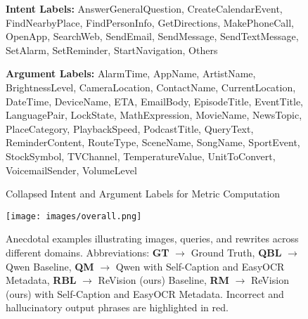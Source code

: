 \begin{figure*}[t]
    \centering
    \begin{tcolorbox}[colback=gray!10, colframe=gray!30, coltitle=black,
        fonttitle=\bfseries, 
        title=Intent and Argument Labels]
        
    \textbf{Intent Labels:}  
    AnswerGeneralQuestion, CreateCalendarEvent, FindNearbyPlace, FindPersonInfo, GetDirections, MakePhoneCall, OpenApp, SearchWeb, SendEmail, SendMessage, SendTextMessage, SetAlarm, SetReminder, StartNavigation, Others
    
    \vspace{5pt}
    
    \textbf{Argument Labels:}  %
    AlarmTime, AppName, ArtistName, BrightnessLevel, CameraLocation, ContactName, CurrentLocation, DateTime, DeviceName, ETA, EmailBody, EpisodeTitle, EventTitle, LanguagePair, LockState, MathExpression, MovieName, NewsTopic, PlaceCategory, PlaybackSpeed, PodcastTitle, QueryText, ReminderContent, RouteType, SceneName, SongName, SportEvent, StockSymbol, TVChannel, TemperatureValue, UnitToConvert, VoicemailSender, VolumeLevel
    \end{tcolorbox}
    \caption{Collapsed Intent and Argument Labels for Metric Computation}
    \label{fig:intent_argument_collapsed_box}
\end{figure*}
\begin{figure*}[t]
  \centering
  \texttt{[image: images/overall.png]} 
    \caption{Anecdotal examples illustrating images, queries, and rewrites across different domains. Abbreviations: \textbf{GT} $\rightarrow$ Ground Truth, \textbf{QBL} $\rightarrow$ Qwen Baseline, \textbf{QM} $\rightarrow$ Qwen with Self-Caption and EasyOCR Metadata, \textbf{RBL} $\rightarrow$ ReVision (ours) Baseline, \textbf{RM} $\rightarrow$ ReVision (ours) with Self-Caption and EasyOCR Metadata. Incorrect and hallucinatory output phrases are highlighted in red.}

  \label{fig:anecdotal_examples}
\end{figure*}